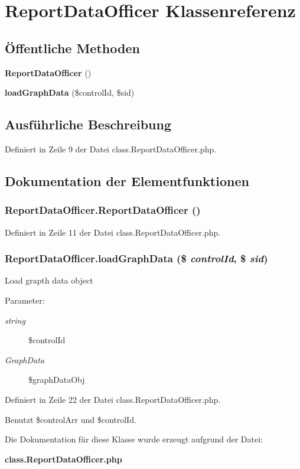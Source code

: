 \section{ReportDataOfficer Klassenreferenz}
\label{classReportDataOfficer}
\subsection*{Öffentliche Methoden}
\begin{CompactItemize}
\item 
{\bf ReportDataOfficer} ()
\item 
{\bf loadGraphData} (\$controlId, \$sid)
\end{CompactItemize}


\subsection{Ausführliche Beschreibung}


Definiert in Zeile 9 der Datei class.ReportDataOfficer.php.

\subsection{Dokumentation der Elementfunktionen}
\subsubsection{\setlength{\rightskip}{0pt plus 5cm}ReportDataOfficer.ReportDataOfficer ()}\label{classReportDataOfficer_0cffec838a4f3c6c198349efa6b1477f}




Definiert in Zeile 11 der Datei class.ReportDataOfficer.php.
\subsubsection{\setlength{\rightskip}{0pt plus 5cm}ReportDataOfficer.loadGraphData (\$ {\em controlId}, \$ {\em sid})}\label{classReportDataOfficer_3b60c363d8a6a385fc902e5651bbfdf3}


Load grapth data object

\begin{Desc}
\item[Parameter:]
\begin{description}
\item[{\em string}]\$controlId \item[{\em GraphData}]\$graphDataObj \end{description}
\end{Desc}


Definiert in Zeile 22 der Datei class.ReportDataOfficer.php.

Benutzt \$controlArr und \$controlId.

Die Dokumentation für diese Klasse wurde erzeugt aufgrund der Datei:\begin{CompactItemize}
\item 
{\bf class.ReportDataOfficer.php}\end{CompactItemize}
